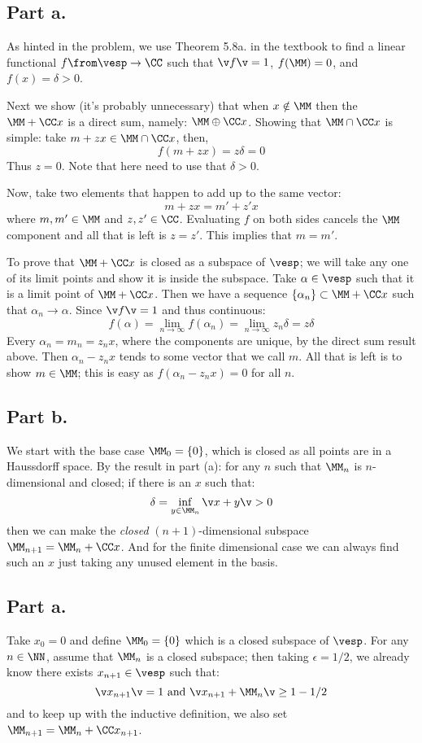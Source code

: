 \subsection*{Part \textbf{a.}}
As hinted in the problem, we use Theorem 5.8a. in the textbook to find a linear functional $f\from \vesp \to \CC$ such that $\v f\v=1$, $f(\MM)=0$, and $f(x)=\delta>0$.

Next we show (it's probably unnecessary) that when $x\notin \MM$ then the $\MM + \CC x$ is a direct sum, namely: $\MM \oplus \CC x$. 
Showing that $\MM\cap \CC x$ is simple: take $m+zx\in \MM \cap \CC x$, then, 
$$f(m+zx)=z\delta =0$$
Thus $z=0$. Note that here need to use that $\delta>0$.

Now, take two elements that happen to add up to the same vector:
$$m+zx = m'+z' x$$
where $m,m' \in \MM$ and $z,z'\in \CC$. 
Evaluating $f$ on both sides cancels the $\MM$ component and all that is left is $z=z'$. 
This implies that $m=m'$.

To prove that $\MM+\CC x$ is closed as a subspace of $\vesp$; we will take any one of its limit points and show it is inside the subspace.
Take $\alpha \in \vesp$ such that it is a limit point of $\MM+\CC x$.
Then we have a sequence $\{\alpha_n \}\subset \MM+\CC x$ such that $\alpha_n \to \alpha$.
Since $\v f\v=1$ and thus continuous:
$$f(\alpha) = \lim_{n\to \infty} f(\alpha_n)= \lim_{n\to \infty} z_n \delta = z\delta$$
Every $\alpha_n = m_n = z_n x$, where the components are unique, by the direct sum result above. 
Then $\alpha_n - z_n x$ tends to some vector that we call $m$. 
All that is left is to show $m\in \MM$; this is easy as $f(\alpha_n - z_n x) =0$ for all $n$.

\subsection*{Part \textbf{b.}}
We start with the base case $\MM_0 =\{0\}$, which is closed as all points are in a Haussdorff space.
By the result in part (a): for any $n$ such that $\MM_n$ is $n$-dimensional and closed; if there is an $x$ such that:
$$\delta=\inf_{y\in \MM_n}\v x+y\v>0$$
then we can make the \emph{closed} $(n+1)$-dimensional subspace $\MM_{n+1}=\MM_n + \CC x$. 
And for the finite dimensional case we can always find such an $x$ just taking any unused element in the basis.

\subsection*{Part \textbf{a.}}
Take $x_0=0 $ and define $\MM_0= \{0\}$ which is a closed subspace of $\vesp$.
For any $n\in \NN$, assume that $\MM_{n} $ is a closed subspace; then taking $\epsilon = 1/2$, we already know there
exists $x_{n+1}\in \vesp$ such that:
$$\v x_{n+1}\v = 1 \text{ and } \v x_{n+1} + \MM_n \v \geq 1-1/2$$
and to keep up with the inductive definition, we also set $\MM_{n+1} = \MM_n+\CC x_{n+1}$.

